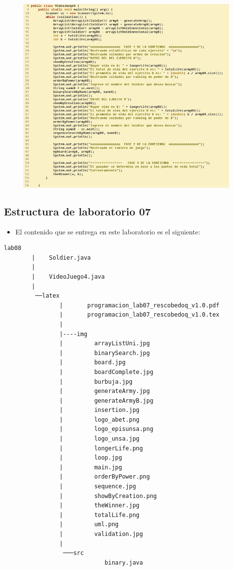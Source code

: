 \documentclass{article}
\begin{document}
		\begin{figure}[H]
		\centering
		\includegraphics[width=1\textwidth,keepaspectratio]{img/main.jpg}
	\end{figure}
	


	
	\subsection{Estructura de laboratorio 07}
	\begin{itemize}	
		\item El contenido que se entrega en este laboratorio es el siguiente:
	\end{itemize}
	
	\begin{lstlisting}[style=ascii-tree]
		lab08
		|    Soldier.java
		|
		|    VideoJuego4.java
		|
		 ──latex
				|   	programacion_lab07_rescobedoq_v1.0.pdf
				|   	programacion_lab07_rescobedoq_v1.0.tex
				|
				|----img
				|         arrayListUni.jpg
				|         binarySearch.jpg
				|         board.jpg
				|         boardComplete.jpg
				|         burbuja.jpg
				|         generateArmy.jpg
				|         generateArmyB.jpg
				|         insertion.jpg
				|         logo_abet.png
				|         logo_episunsa.png
				|         logo_unsa.jpg
				|         longerLife.png
				|         loop.jpg
				|         main.jpg
				|         orderByPower.png
				|         sequence.jpg
				|         showByCreation.png
				|         theWinner.jpg
				|         totalLife.png
				|         uml.png
				|         validation.jpg
				|
				 ───src
							 binary.java	
			
		
	\end{lstlisting}    
	
\end{document}
